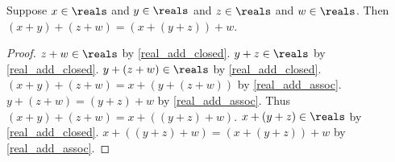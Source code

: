 \begin{lemma}\label{real_add_regroup}
    Suppose $x\in\reals$ and $y\in\reals$ and $z\in\reals$ and $w\in\reals$.
    Then $(x + y) + (z + w) = (x + (y + z)) + w$.
\end{lemma}
\begin{proof}
    $z + w\in\reals$ by \cref{real_add_closed}.
    $y + z\in\reals$ by \cref{real_add_closed}.
    $y + (z + w)\in\reals$ by \cref{real_add_closed}.
    $(x + y) + (z + w) = x + (y + (z + w))$ by \cref{real_add_assoc}.
    $y + (z + w) = (y + z) + w$ by \cref{real_add_assoc}.
    Thus $(x + y) + (z + w) = x + ((y + z) + w)$.
    $x + (y + z)\in\reals$ by \cref{real_add_closed}.
    $x + ((y + z) + w) = (x + (y + z)) + w$ by \cref{real_add_assoc}.
\end{proof}

